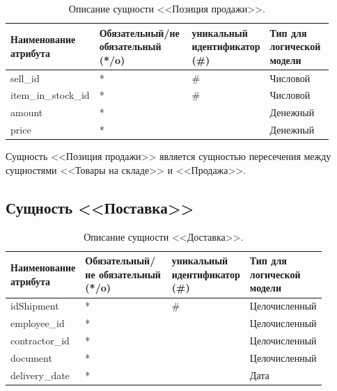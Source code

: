 \documentclass[14pt]{extreport}
\begin{document}
        \begin{table}[H]
            \caption{Описание сущности <<Позиция продажи>>.}
            
            \begin{tabular}{|p{0.225\linewidth}|p{0.3\linewidth}|p{0.2\linewidth}|p{0.2\linewidth}|}
                \hline
                Наименование атрибута & Обязательный/не обязательный (*/o) & уникальный идентификатор (\#) & Тип для логической модели
                \\ \hline
                sell\_id & * & \# & Числовой\\ \hline
                item\_in\_stock\_id & * & \# & Числовой \\ \hline
                amount & * & & Денежный \\ \hline
                price & * & & Денежный \\ \hline
            \end{tabular}
        \end{table}

        Сущность <<Позиция продажи>> является сущностью пересечения между сущностями <<Товары на складе>> и <<Продажа>>.


    \subsection*{Сущность <<Поставка>>}

        \begin{table}[H]
            \caption{Описание сущности <<Доставка>>.}
            
            \begin{tabular}{|p{0.2\linewidth}|p{0.3\linewidth}|p{0.2\linewidth}|p{0.2\linewidth}|}
                \hline
                Наименование атрибута & Обязательный/не обязательный (*/o) & уникальный идентификатор (\#) & Тип для логической модели
                \\ \hline
                idShipment & * & \# & Целочисленный \\ \hline
                employee\_id & * & & Целочисленный\\ \hline
                contractor\_id & * & & Целочисленный \\ \hline
                document & * & & Целочисленный \\ \hline
                delivery\_date & * & & Дата \\ \hline
            \end{tabular}
        \end{table}
\end{document}
